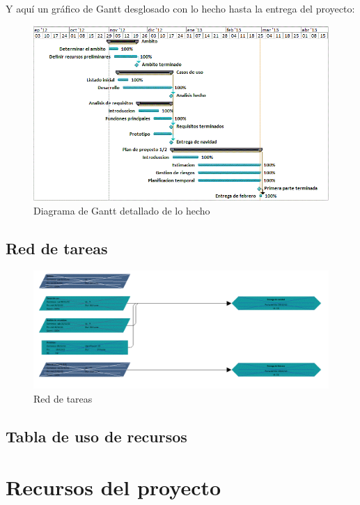 \documentclass[spanish,a4paper,12pt]{report}	%
\begin{document}
	\newpage

	Y aquí un gráfico de Gantt desglosado con lo hecho hasta la entrega del proyecto:

	\begin{figure}[!h]
	\centering
	\includegraphics[scale=0.8]{GraficoGanttDetallado.png}
	\caption{Diagrama de Gantt detallado de lo hecho}
	\end{figure}

	\section{Red de tareas}
	\begin{figure}[!h]
	\centering
	\includegraphics[scale=0.8]{RedTareas.png}
	\caption{Red de tareas}
	\end{figure}

	\section{Tabla de uso de recursos}

\newpage
\mbox{}
\thispagestyle{empty}						%
\newpage
\setcounter{section}{0}

\chapter{Recursos del proyecto}
\end{document}
